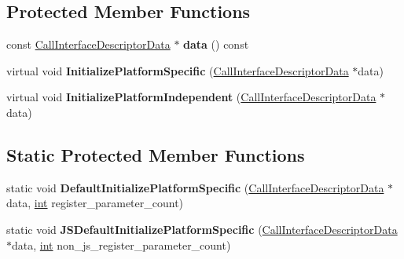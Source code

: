 \subsection*{Protected Member Functions}
\begin{DoxyCompactItemize}
\item 
\mbox{\label{classv8_1_1internal_1_1CallInterfaceDescriptor_af2c708696d862ffef88e8b577206f10e}} 
const \mbox{\hyperlink{classv8_1_1internal_1_1CallInterfaceDescriptorData}{Call\+Interface\+Descriptor\+Data}} $\ast$ {\bfseries data} () const
\item 
\mbox{\label{classv8_1_1internal_1_1CallInterfaceDescriptor_aa40f17d0e6cfefbbe78d077a7de52bcf}} 
virtual void {\bfseries Initialize\+Platform\+Specific} (\mbox{\hyperlink{classv8_1_1internal_1_1CallInterfaceDescriptorData}{Call\+Interface\+Descriptor\+Data}} $\ast$data)
\item 
\mbox{\label{classv8_1_1internal_1_1CallInterfaceDescriptor_aeac8cf5fe74b0b92442f3e1b4a48dd15}} 
virtual void {\bfseries Initialize\+Platform\+Independent} (\mbox{\hyperlink{classv8_1_1internal_1_1CallInterfaceDescriptorData}{Call\+Interface\+Descriptor\+Data}} $\ast$data)
\end{DoxyCompactItemize}
\subsection*{Static Protected Member Functions}
\begin{DoxyCompactItemize}
\item 
\mbox{\label{classv8_1_1internal_1_1CallInterfaceDescriptor_a168b25b416322f1f102e6b69aed6eb8c}} 
static void {\bfseries Default\+Initialize\+Platform\+Specific} (\mbox{\hyperlink{classv8_1_1internal_1_1CallInterfaceDescriptorData}{Call\+Interface\+Descriptor\+Data}} $\ast$data, \mbox{\hyperlink{classint}{int}} register\+\_\+parameter\+\_\+count)
\item 
\mbox{\label{classv8_1_1internal_1_1CallInterfaceDescriptor_add5cef56ec5a60545aabf765e5c1283f}} 
static void {\bfseries J\+S\+Default\+Initialize\+Platform\+Specific} (\mbox{\hyperlink{classv8_1_1internal_1_1CallInterfaceDescriptorData}{Call\+Interface\+Descriptor\+Data}} $\ast$data, \mbox{\hyperlink{classint}{int}} non\+\_\+js\+\_\+register\+\_\+parameter\+\_\+count)
\end{DoxyCompactItemize}
